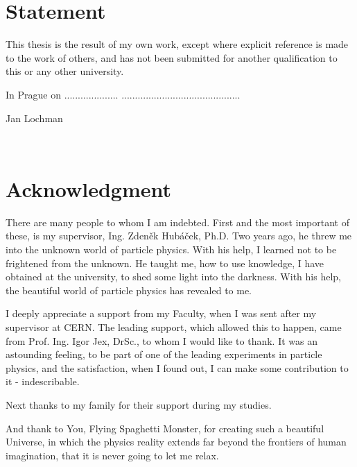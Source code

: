 \documentclass[a4paper,11pt,twoside,openright]{book}
\newcommand{\autor}{Jan Lochman}
\begin{document}
\section*{Statement}

\vspace{0.5cm} 
This thesis is the result of my own work, except where explicit reference
is made to the work of others, and has not been submitted for another
qualification to this or any other university.

\vspace{5mm}In Prague on ....................\hfill 
............................................       
\begin{flushright}
  \autor 
\end{flushright}

\newpage 
\thispagestyle{empty}  
~
   
\newpage 
\thispagestyle{empty}  
\section*{Acknowledgment}

\vspace{0.5cm} 
There are many people to whom I am indebted. First and the most important of
these, is my supervisor, Ing. Zden\v{e}k Hub\'{a}\v{c}ek, Ph.D. Two years ago,
he threw me into the unknown world of particle physics. With his help, I learned
not to be frightened from the unknown. He taught me, how to use knowledge, I have
obtained at the university, to shed some light into the darkness. With his help,
the beautiful world of particle physics has revealed to me.

I deeply appreciate a support from my Faculty, when I was sent after my
supervisor at CERN. The leading support, which allowed this to happen, came from
Prof. Ing. Igor Jex, DrSc., to whom I would like to thank. It was an astounding
feeling, to be part of one of the leading experiments in particle physics, and the
satisfaction, when I found out, I can make some contribution to it -
indescribable. 

Next thanks to my family for their support during my studies.

And thank to You, Flying Spaghetti Monster, for creating such a beautiful
Universe, in which the physics reality extends far beyond the frontiers of human
imagination, that it is never going to let me relax.
\end{document}
